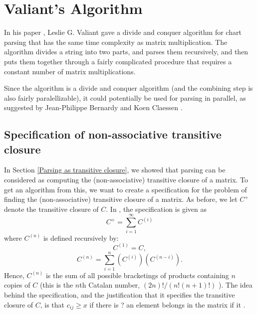 \newcommand{\zeromat}{\mathbf{0}}
\newcommand{\zeromatrix}{\zeromat}
\newcommand{\nap}[2]{#1^{(#2)}}
\newcommand{\tc}[1]{#1^+}
\newcommand{\rc}[1]{#1^*}
\section{Valiant's Algorithm}
In his paper \cite{Valiant}, Leslie G. Valiant gave a divide and conquer algorithm for chart parsing that has the same time complexity as matrix multiplication. The algorithm divides a string into two parts, and parses them recursively, and then puts them together through a fairly complicated procedure that requires a constant number of matrix multiplications.

Since the algorithm is a divide and conquer algorithm (and the combining step is also fairly paralellizable), it could potentially be used for parsing in parallel, as suggested by Jean-Philippe Bernardy and Koen Claessen \cite{JP-PP}. 

\subsection{Specification of non-associative transitive closure}
In Section \ref{Parsing as transitive closure}, we showed that parsing can be considered as computing the (non-associative) transitive closure of a matrix. To get an algorithm from this, we want to create a specification for the problem of finding the (non-associative) transitive closure of a matrix. As before, we let $C^+$ denote the transitive closure of $C$. In \cite{Valiant}, the specification is given as 
\begin{equation}
  \label{VSpec}
  C^+ = \sum_{i = 1}^{\infty}\nap{C}{i}
\end{equation}
where $\nap{C}{n}$ is defined recursively by:
\begin{equation}
  \nap{C}{1} = C,
\end{equation}
\begin{equation}
  \label{VSpec-rec}
  \nap{C}{n} = \sum_{i = 1}^n(\nap{C}{i})(\nap{C}{n-i}).
\end{equation}
Hence, $\nap{C}{n}$ is the sum of all possible bracketings of products containing $n$ copies of $C$ (this is the $n$th Catalan number, $(2n)!/(n!(n+1)!)$ \cite{mathworld-catalan}).
The idea behind the specification, and the justification that it specifies the transitive closure of $C$, is that $c_{ij} \ge x$ if there is ? an element belongs in the matrix if it .

